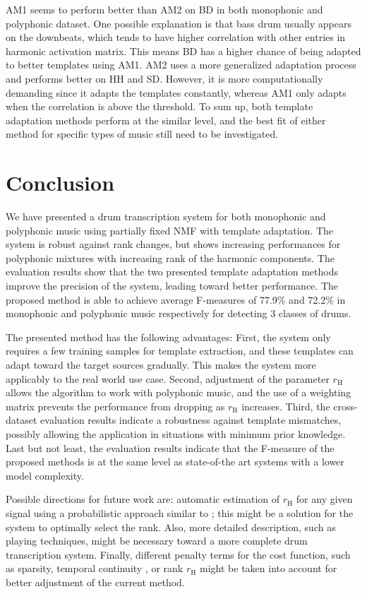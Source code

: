 \documentclass{article}
\begin{document}
AM1 seems to perform better than AM2 on BD in both monophonic and polyphonic dataset. One possible explanation is that bass drum usually appears on the downbeats, which tends to have higher correlation with other entries in harmonic activation matrix. This means BD has a higher chance of being adapted to better templates using AM1. AM2 uses a more generalized adaptation process and performs better on HH and SD. However, it is more computationally demanding since it adapts the templates constantly, whereas AM1 only adapts when the correlation is above the threshold. To sum up, both template adaptation methods perform at the similar level, and the best fit of either method for specific types of music still need to be investigated. 

\section{Conclusion}\label{sec:Conclusion}
We have presented a drum transcription system for both monophonic and polyphonic music using partially fixed NMF with template adaptation. The system is robust against rank changes, but shows increasing performances for polyphonic mixtures with increasing rank of the harmonic components. The evaluation results show that the two presented template adaptation methods improve the precision of the system, leading toward better performance. The proposed method is able to achieve average F-measures of 77.9\% and 72.2\% in monophonic and polyphonic music respectively for detecting 3 classes of drums. 

The presented method has the following advantages: 
First, the system only requires a few training samples for template extraction, and these templates can adapt toward the target sources gradually. This makes the system more applicably to the real world use case. 
Second, adjustment of the parameter $r_\mathrm{H}$ allows the algorithm to work with polyphonic music, and the use of a weighting matrix prevents the performance from dropping as $r_\mathrm{H}$ increases. 
Third, the cross-dataset evaluation results indicate a robustness against template mismatches, possibly allowing the application in situations with minimum prior knowledge. 
Last but not least, the evaluation results indicate that the F-measure of the proposed methods is at the same level as state-of-the art systems with a lower model complexity. 

Possible directions for future work are:
automatic estimation of $r_\mathrm{H}$ for any given signal using a probabilistic approach similar to  \cite{ouo_inmf_2010}; this might be a solution for the system to optimally select the rank. Also, more detailed description, such as playing techniques, might be necessary toward a more complete drum transcription system. Finally, different penalty terms for the cost function, such as sparsity, temporal continuity \cite{virtanen_ssnmf_2007}, or rank $r_\mathrm{H}$ might be taken into account for better adjustment of the current method.   


\end{document}
